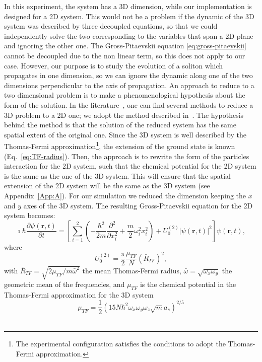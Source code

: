 In this experiment, the system has a 3D dimension, while our implementation is designed for a 2D system. This would not be a problem if the dynamic of the 3D system was described by three decoupled equations, so that we could independently solve the two corresponding to the variables that span a 2D plane and ignoring the other one. The Gross-Pitaevskii equation \eqref{eq:gross-pitaevskii} cannot be decoupled due to the non linear term, so this does not apply to our case. However, our purpose is to study the evolution of a soliton which propagates in one dimension, so we can ignore the dynamic along one of the two dimensions perpendicular to the axis of propagation. An approach to reduce to a two dimensional problem is to make a phenomenological hypothesis about the form of the solution. In the literature~\citep{JKP98,SZ98,Sal01,SPR02}, one can find several methods to reduce a 3D problem to a 2D one; we adopt the method described in~\citep{PietroMassignan}. The hypothesis behind the method is that the solution of the reduced system has the same spatial extent of the original one. Since the 3D system is well described by the Thomas-Fermi approximation\footnote{The experimental configuration satisfies the conditions to adopt the Thomas-Fermi approximation.}, the extension of the ground state is known (Eq.~\eqref{eq:TF-radius}). Then, the approach is to rewrite the form of the particles interaction for the 2D system, such that the chemical potential for the 2D system is the same as the one of the 3D system. This will ensure that the spatial extension of the 2D system will be the same as the 3D system (see Appendix~\ref{App:A}). For our simulation we reduced the dimension keeping the $x$ and $y$ axes of the 3D system. The resulting Gross-Pitaevskii equation for the 2D system becomes:
\begin{equation} \label{eq:gross-pitaevskii-simulation}
\imath \hbar \frac{\partial \psi(\textbf{r}, t)}{\partial t} = \left[ \sum_{i=1}^2 \left( -\frac{\hbar^2}{2m} \frac{\partial^2}{\partial x_i^2} + \frac{m}{2} \omega_i^2 x_i^2 \right) + U_0^{(2)} |\psi(\textbf{r}, t)|^2 \right] \psi(\textbf{r}, t),
\end{equation}
where
\begin{equation}
U_0^{(2)} = \frac{\pi}{2} \frac{\mu_{TF}}{N} \left( \bar{R}_{TF} \right)^2 ,
\end{equation}
with $\bar{R}_{TF} = \sqrt{2\mu_{TF} / m \bar{\omega}^2}$ the mean Thomas-Fermi radius, $\bar{\omega} = \sqrt{ \omega_x \omega_y}$ the geometric mean of the frequencies,
and $\mu_{TF}$ is the chemical potential in the Thomas-Fermi approximation for the 3D system
\begin{equation}
\mu_{TF} = \frac{1}{2} \left( 15 N \hbar^2 \omega_x \omega_y \omega_z \sqrt{m} a_s \right)^{2/5}
\end{equation}
\\

